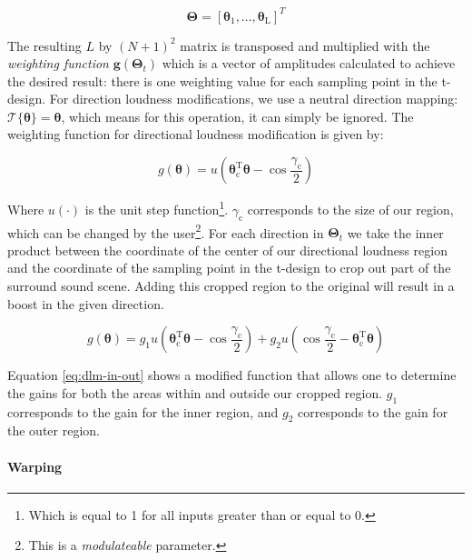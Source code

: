 $$
\boldsymbol{\Theta}=\left[\boldsymbol{\theta}_{1}, \ldots, \boldsymbol{\theta}_{\mathrm{L}}\right]^{T}
$$

The resulting $L$ by $(N + 1)^2$ matrix is transposed and multiplied with the \textit{weighting function} $\boldsymbol{g}\left(\boldsymbol{\Theta}_{t}\right)$ which is a vector of amplitudes calculated to achieve the desired result: there is one weighting value for each sampling point in the t-design. For direction loudness modifications, we use a neutral direction mapping: $\mathcal{T}\{\boldsymbol{\theta}\}=\boldsymbol{\theta}$, which means for this operation, it can simply be ignored. The weighting function for directional loudness modification is given by:

\begin{equation}
g(\boldsymbol{\theta})=u\left(\boldsymbol{\theta}_{\mathrm{c}}^{\mathrm{T}} \boldsymbol{\theta}-\cos \frac{\gamma_{\mathrm{c}}}{2}\right)
\end{equation}

Where $u(\cdot)$ is the unit step function\footnote{Which is equal to 1 for all inputs greater than or equal to 0.}. $\gamma_{\mathrm{c}}$ corresponds to the size of our region, which can be changed by the user\footnote{This is a \textit{modulateable} parameter.}. For each direction in $\boldsymbol{\Theta}_{t}$ we take the inner product between the coordinate of the center of our directional loudness region and the coordinate of the sampling point in the t-design to crop out part of the surround sound scene. Adding this cropped region to the original will result in a boost in the given direction. 

\begin{equation}
g(\boldsymbol{\theta})=g_{1} u\left(\boldsymbol{\theta}_{\mathrm{c}}^{\mathrm{T}} \boldsymbol{\theta}-\cos \frac{\gamma_{\mathrm{c}}}{2}\right)+g_{2} u\left(\cos \frac{\gamma_{\mathrm{c}}}{2}-\boldsymbol{\theta}_{\mathrm{c}}^{\mathrm{T}} \boldsymbol{\theta}\right)
\label{eq:dlm-in-out}
\end{equation}

Equation \ref{eq:dlm-in-out} shows a modified function that allows one to determine the gains for both the areas within and outside our cropped region. $g_{1}$ corresponds to the gain for the inner region, and $g_{2}$ corresponds to the gain for the outer region. 

\paragraph{Warping}

